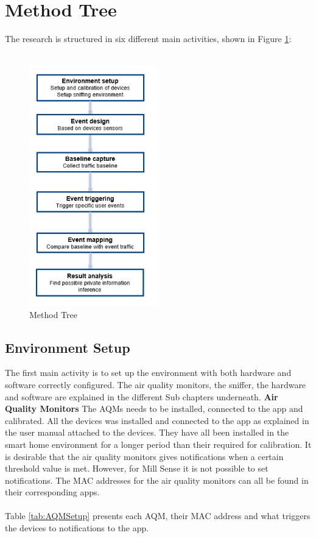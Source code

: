 \section{Method Tree}
The research is structured in six different main activities, shown in Figure \ref{fig:MethodTree}:
\\\\
\begin{figure} [H]
    \centering
    \includegraphics[width=0.5\textwidth]{figures/MethodTree.png}
    \caption{Method Tree}
    \label{fig:MethodTree}
\end{figure}
\subsection{Environment Setup}
The first main activity is to set up the environment with both hardware and software correctly configured. The air quality monitors, the sniffer, the hardware and software are explained in the different Sub chapters underneath. 
\textbf{Air Quality Monitors}
The AQMs needs to be installed, connected to the app and calibrated. All the devices was installed and connected to the app as explained in the user manual attached to the devices. They have all been installed in the smart home environment for a longer period than their required for calibration. It is desirable that the air quality monitors gives notifications when a certain threshold value is met. However, for Mill Sense it is not possible to set notifications. The MAC addresses for the air quality monitors can all be found in their corresponding apps. 
\\\\
Table \ref{tab:AQMSetup} presents each AQM, their MAC address and what triggers the devices to notifications to the app. 

